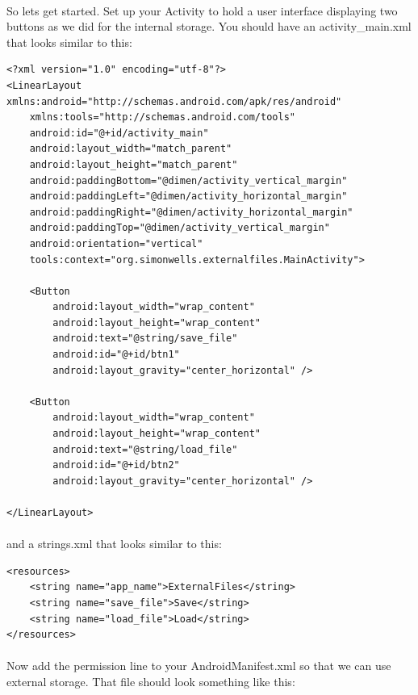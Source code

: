 \paragraph{} So lets get started. Set up your Activity to hold a user interface displaying two buttons as we did for the internal storage. You should have an activity\_main.xml that looks similar to this:

\begin{lstlisting}
<?xml version="1.0" encoding="utf-8"?>
<LinearLayout xmlns:android="http://schemas.android.com/apk/res/android"
    xmlns:tools="http://schemas.android.com/tools"
    android:id="@+id/activity_main"
    android:layout_width="match_parent"
    android:layout_height="match_parent"
    android:paddingBottom="@dimen/activity_vertical_margin"
    android:paddingLeft="@dimen/activity_horizontal_margin"
    android:paddingRight="@dimen/activity_horizontal_margin"
    android:paddingTop="@dimen/activity_vertical_margin"
    android:orientation="vertical"
    tools:context="org.simonwells.externalfiles.MainActivity">

    <Button
        android:layout_width="wrap_content"
        android:layout_height="wrap_content"
        android:text="@string/save_file"
        android:id="@+id/btn1"
        android:layout_gravity="center_horizontal" />

    <Button
        android:layout_width="wrap_content"
        android:layout_height="wrap_content"
        android:text="@string/load_file"
        android:id="@+id/btn2"
        android:layout_gravity="center_horizontal" />

</LinearLayout>
\end{lstlisting}

\paragraph{} and a strings.xml that looks similar to this:

\begin{lstlisting}
<resources>
    <string name="app_name">ExternalFiles</string>
    <string name="save_file">Save</string>
    <string name="load_file">Load</string>
</resources>
\end{lstlisting}

\paragraph{} Now add the permission line to your AndroidManifest.xml so that we can use external storage. That file should look something like this:

